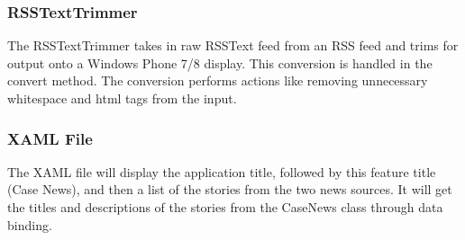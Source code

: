 \documentclass[pdftex,12pt,letter]{article}
\begin{document}
\subsubsection{RSSTextTrimmer}
The RSSTextTrimmer takes in raw RSSText feed from an RSS feed and
trims for output onto a Windows Phone 7/8 display. This conversion is handled in the convert method. The conversion performs actions like removing
unnecessary whitespace and html tags from the input.
\subsubsection{XAML File}
The XAML file will display the application title, followed by this feature title
(Case News), and then a list of the stories from the two news sources. It will
get the titles and descriptions of the stories from the CaseNews class through
data binding.

\end{document}
